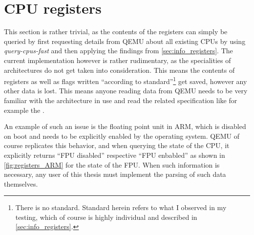 \section{CPU registers}
This section is rather trivial, as the contents of the registers can simply be queried
by first requesting details from QEMU about all existing CPUs by using \emph{query-cpus-fast}
and then applying the findings from \autoref{sec:info_registers}.
The current implementation however is rather rudimentary,
as the specialities of architectures do not get taken into consideration.
This means the contents of registers as well as flags written
\enquote{according to standard}\footnote{There is no standard. Standard herein refers to what I observed in my testing, which of course is highly individual and described in \autoref{sec:info_registers}.}
get saved, however any other data is lost.
This means anyone reading data from QEMU needs to be very familiar with the architecture in use
and read the related specification like for example the .

An example of such an issue is the floating point unit in ARM,
which is disabled on boot and needs to be explicitly enabled by the operating system.
QEMU of course replicates this behavior,
and when querying the state of the CPU, it explicitly returns
\enquote{FPU disabled} respective \enquote{FPU enbabled}
as shown in \autoref{fig:registers_ARM} for the state of the FPU.
When such information is necessary, any user of this thesis must implement the parsing of such data themselves.

